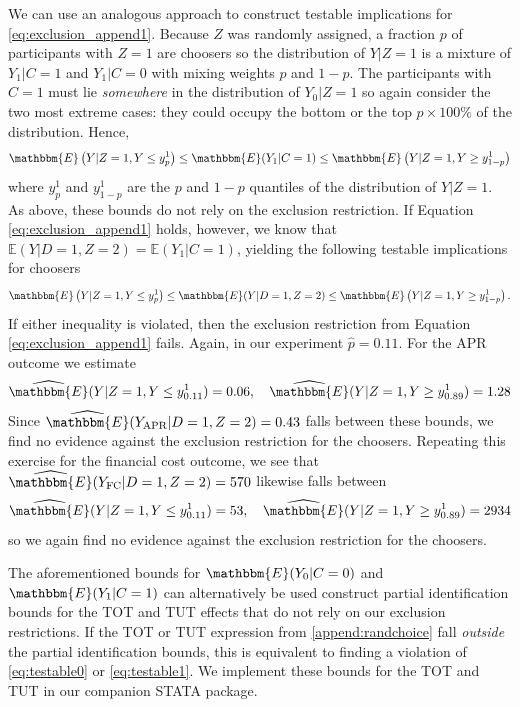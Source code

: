 We can use an analogous approach to construct testable implications for \ref{eq:exclusion_append1}. 
Because $Z$ was randomly assigned, a fraction $p$ of participants with $Z = 1$ are choosers so the distribution of $Y|Z=1$ is a mixture of $Y_1|C=1$ and $Y_1|C=0$ with mixing weights $p$ and $1 -p$.
The participants with $C = 1$ must lie \emph{somewhere} in the distribution of $Y_0|Z=1$ so again consider the two most extreme cases: they could occupy the bottom or the top $p\times 100\%$ of the distribution. 
Hence,
\[
\mathbbm{E}\left(Y|Z=1,Y\leq y^1_{p}\right) \leq \mathbbm{E}(Y_1|C=1) \leq \mathbbm{E}\left(Y|Z=1,Y \geq y^1_{1-p}\right)
\]
where $y^1_p$ and $y^1_{1-p}$ are the $p$ and $1 - p$ quantiles of the distribution of $Y|Z=1$.
As above, these bounds do not rely on the exclusion restriction.
If Equation \ref{eq:exclusion_append1} holds, however, we know that $\mathbb{E}(Y|D=1,Z=2) = \mathbb{E}(Y_1|C=1)$, yielding the following testable implications for choosers
\begin{equation}
\mathbbm{E}\left(Y|Z=1,Y\leq y^1_{p}\right) \leq \mathbbm{E}(Y|D=1,Z=2) \leq \mathbbm{E}\left(Y|Z=1,Y \geq y^1_{1-p}\right).
\label{eq:testable1}
\end{equation}
If either inequality is violated, then the exclusion restriction from Equation \ref{eq:exclusion_append1} fails.
Again, in our experiment $\widehat{p}=0.11$. For the APR outcome we estimate
\[
\widehat{\mathbbm{E}}(Y|Z=1,Y\leq y^1_{0.11}) = 0.06, \quad
\widehat{\mathbbm{E}}(Y|Z=1,Y\geq y^1_{0.89}) = 1.28
\]
Since $\widehat{\mathbbm{E}}(Y_\text{APR}|D=1,Z=2) = 0.43$ falls between these bounds, we find no evidence against the exclusion restriction for the choosers. 
Repeating this exercise for the financial cost outcome, we see  that $\widehat{\mathbbm{E}}(Y_\text{FC}|D=1,Z=2)= 570$ likewise falls between
\[
\widehat{\mathbbm{E}}(Y|Z=1,Y\leq y^1_{0.11}) = 53, \quad
\widehat{\mathbbm{E}}(Y|Z=1,Y\geq y^1_{0.89}) = 2934
\]
so we again find no evidence against the exclusion restriction for the choosers.

The aforementioned bounds for $\mathbbm{E}(Y_0|C=0)$ and $\mathbbm{E}(Y_1|C=1)$ can alternatively be used construct partial identification bounds for the TOT and TUT effects that do not rely on our exclusion restrictions. If the TOT or TUT expression from \ref{append:randchoice} fall \emph{outside} the partial identification bounds, this is equivalent to finding a violation of \ref{eq:testable0} or \ref{eq:testable1}. We implement these bounds for the TOT and TUT in our companion STATA package.


